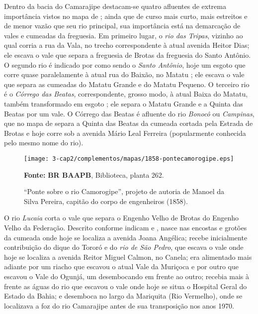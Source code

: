 Dentro da bacia do Camarajipe destacam-se quatro afluentes de extrema importância vistos no mapa de ; ainda que de curso mais curto, mais estreitos e de menor vazão que seu rio principal, sua importância está na demarcação de vales e cumeadas da freguesia. Em primeiro lugar, o \textit{rio das Tripas}, vizinho ao qual corria a rua da Vala, no trecho correspondente à atual avenida Heitor Dias; ele escava o vale que separa a freguesia de Brotas da freguesia do Santo Antônio. O segundo rio é indicado por  como sendo o \textit{Santo Antônio}, hoje um esgoto que corre quase paralelamente à atual rua do Baixão, no Matatu \cite[p.~136]{santos_aguas_2010}; ele escava o vale que separa as cumeadas do Matatu Grande e do Matatu Pequeno. O terceiro rio é o \textit{Córrego das Beatas}, correspondente, grosso modo, à atual Baixa do Matatu, também transformado em esgoto \cite[p.~158]{santos_aguas_2010}; ele separa o Matatu Grande e a Quinta das Beatas por um vale. O Córrego das Beatas é afluente do rio \textit{Bonocô} ou \textit{Campinas}, que no mapa de  separa a Quinta das Beatas da cumeada cortada pela Estrada de Brotas e hoje corre sob a avenida Mário Leal Ferreira (popularmente conhecida pelo mesmo nome do rio).

\begin{sidewaysfigure}[!htp]
\centering
\texttt{[image: 3-cap2/complementos/mapas/1858-pontecamorogipe.eps]}{\footnotesize \par \textbf{Fonte:} \textbf{BR BAAPB}, Biblioteca, planta 262. \par}
\caption{``Ponte sobre o rio Camorogipe'', projeto de autoria de Manoel da Silva Pereira, capitão do corpo de engenheiros (1858).}\label{fig:pontecamorogipe}
\end{sidewaysfigure}

O rio \textit{Lucaia} corta o vale que separa o Engenho Velho de Brotas do Engenho Velho da Federação. Descrito conforme indicam  e , nasce nas encostas e grotões da cumeada onde hoje se localiza a avenida Joana Angélica; recebe inicialmente contribuição do dique do Tororó e do \textit{rio de São Pedro}, que escava o vale onde hoje se localiza a avenida Reitor Miguel Calmon, no Canela; era alimentado mais adiante por um riacho que escavou o atual Vale da Muriçoca e por outro que escavou o Vale do Ogunjá, um desembocando em frente ao outro; recebia mais à frente as águas do rio que escavou o vale onde hoje se situa o Hospital Geral do Estado da Bahia; e desemboca no largo da Mariquita (Rio Vermelho), onde se localizava a foz do rio Camarajipe antes de sua transposição nos anos 1970.

